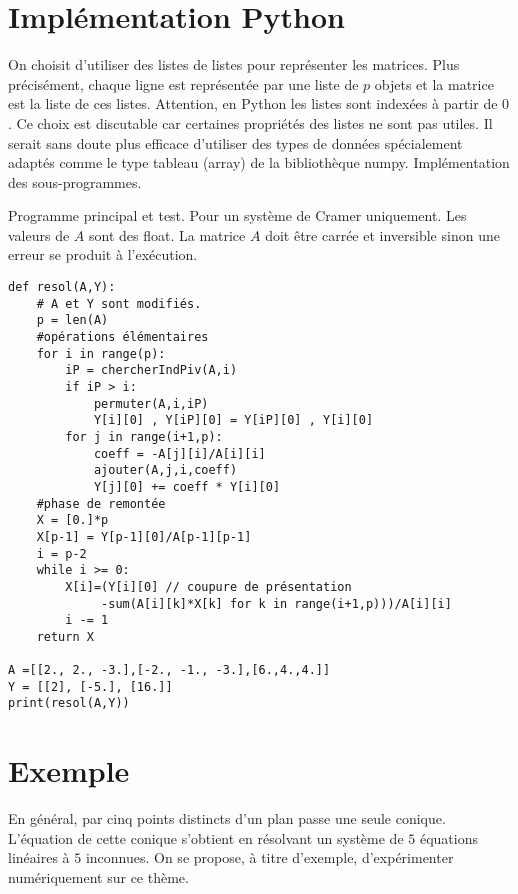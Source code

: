 \section{Implémentation Python}
On choisit d'utiliser des listes de listes pour représenter les matrices. Plus précisément, chaque ligne est représentée par une liste de $p$ objets et la matrice est la liste de ces listes. Attention, en Python les listes sont indexées à partir de $0$.\newline
Ce choix est discutable car certaines propriétés des listes ne sont pas utiles. Il serait sans doute plus efficace d'utiliser des types de données spécialement adaptés comme le type tableau (array) de la bibliothèque numpy.\newline
Implémentation des sous-programmes.

Programme principal et test.\newline
Pour un système de Cramer uniquement. Les valeurs de $A$ sont des float. La matrice $A$ doit être carrée et inversible sinon une erreur se produit à l'exécution.
%
\begin{verbatim}
def resol(A,Y):
    # A et Y sont modifiés.
    p = len(A)
    #opérations élémentaires
    for i in range(p):
        iP = chercherIndPiv(A,i)
        if iP > i:
            permuter(A,i,iP)
            Y[i][0] , Y[iP][0] = Y[iP][0] , Y[i][0]
        for j in range(i+1,p):
            coeff = -A[j][i]/A[i][i]
            ajouter(A,j,i,coeff)
            Y[j][0] += coeff * Y[i][0]
    #phase de remontée
    X = [0.]*p
    X[p-1] = Y[p-1][0]/A[p-1][p-1]
    i = p-2
    while i >= 0:
        X[i]=(Y[i][0] // coupure de présentation
             -sum(A[i][k]*X[k] for k in range(i+1,p)))/A[i][i]
        i -= 1
    return X
    
A =[[2., 2., -3.],[-2., -1., -3.],[6.,4.,4.]]
Y = [[2], [-5.], [16.]]
print(resol(A,Y))
\end{verbatim}

\section{Exemple}
En général, par cinq points distincts d'un plan passe une seule conique. L'équation de cette conique s'obtient en résolvant un système de $5$  équations linéaires à $5$ inconnues. On se propose, à titre d'exemple, d'expérimenter numériquement sur ce thème.
